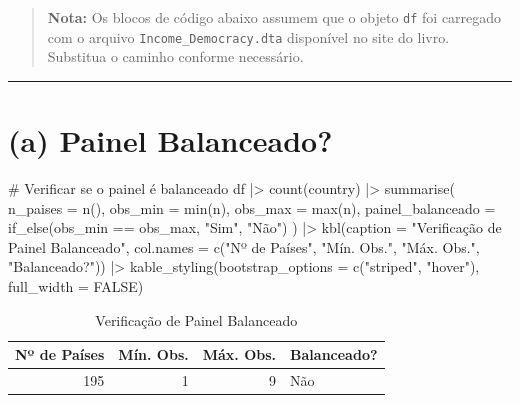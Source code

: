 \documentclass[
  portuguese,
  letterpaper,
  DIV=11,
  numbers=noendperiod]{scrartcl}
\newenvironment{Shaded}{\begin{snugshade}}{\end{snugshade}}
\newcommand{\AttributeTok}[1]{\textcolor[rgb]{0.40,0.45,0.13}{#1}}
\newcommand{\CommentTok}[1]{\textcolor[rgb]{0.37,0.37,0.37}{#1}}
\newcommand{\ConstantTok}[1]{\textcolor[rgb]{0.56,0.35,0.01}{#1}}
\newcommand{\FunctionTok}[1]{\textcolor[rgb]{0.28,0.35,0.67}{#1}}
\newcommand{\NormalTok}[1]{\textcolor[rgb]{0.00,0.23,0.31}{#1}}
\newcommand{\SpecialCharTok}[1]{\textcolor[rgb]{0.37,0.37,0.37}{#1}}
\newcommand{\StringTok}[1]{\textcolor[rgb]{0.13,0.47,0.30}{#1}}
\begin{document}
\begin{quote}
\textbf{Nota:} Os blocos de código abaixo assumem que o objeto
\texttt{df} foi carregado com o arquivo \texttt{Income\_Democracy.dta}
disponível no site do livro. Substitua o caminho conforme necessário.
\end{quote}

\begin{center}\rule{0.5\linewidth}{0.5pt}\end{center}

\section{(a) Painel Balanceado?}\label{a-painel-balanceado}

\begin{Shaded}
\begin{Highlighting}[]
\CommentTok{\# Verificar se o painel é balanceado}
\NormalTok{df }\SpecialCharTok{|\textgreater{}}
  \FunctionTok{count}\NormalTok{(country) }\SpecialCharTok{|\textgreater{}}
  \FunctionTok{summarise}\NormalTok{(}
    \AttributeTok{n\_paises        =} \FunctionTok{n}\NormalTok{(),}
    \AttributeTok{obs\_min         =} \FunctionTok{min}\NormalTok{(n),}
    \AttributeTok{obs\_max         =} \FunctionTok{max}\NormalTok{(n),}
    \AttributeTok{painel\_balanceado =} \FunctionTok{if\_else}\NormalTok{(obs\_min }\SpecialCharTok{==}\NormalTok{ obs\_max, }\StringTok{"Sim"}\NormalTok{, }\StringTok{"Não"}\NormalTok{)}
\NormalTok{  ) }\SpecialCharTok{|\textgreater{}}
  \FunctionTok{kbl}\NormalTok{(}\AttributeTok{caption =} \StringTok{"Verificação de Painel Balanceado"}\NormalTok{,}
      \AttributeTok{col.names =} \FunctionTok{c}\NormalTok{(}\StringTok{"Nº de Países"}\NormalTok{, }\StringTok{"Mín. Obs."}\NormalTok{, }\StringTok{"Máx. Obs."}\NormalTok{, }\StringTok{"Balanceado?"}\NormalTok{)) }\SpecialCharTok{|\textgreater{}}
  \FunctionTok{kable\_styling}\NormalTok{(}\AttributeTok{bootstrap\_options =} \FunctionTok{c}\NormalTok{(}\StringTok{"striped"}\NormalTok{, }\StringTok{"hover"}\NormalTok{), }\AttributeTok{full\_width =} \ConstantTok{FALSE}\NormalTok{)}
\end{Highlighting}
\end{Shaded}

\begin{table}
\centering
\caption{\label{tab:painel-balanceado}Verificação de Painel Balanceado}
\centering
\begin{tabular}[t]{r|r|r|l}
\hline
Nº de Países & Mín. Obs. & Máx. Obs. & Balanceado?\\
\hline
195 & 1 & 9 & Não\\
\hline
\end{tabular}
\end{table}
\end{document}
